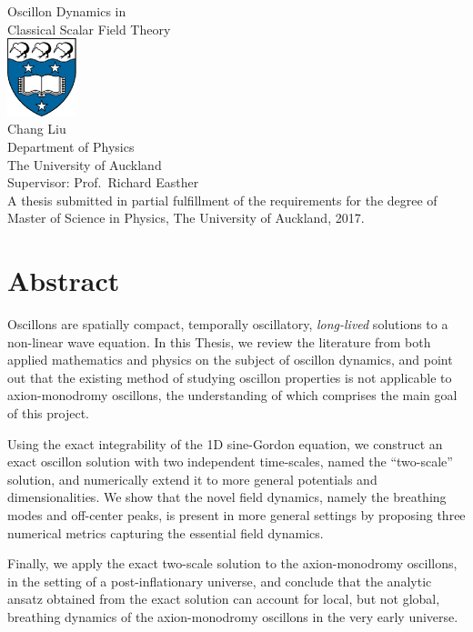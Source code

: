 \documentclass[11pt]{book}
\begin{document}
\pagestyle{empty}
\begin{center}
\vspace{1cm}
{\Huge Oscillon Dynamics in\\Classical Scalar Field Theory}\\
\vspace{35mm} 
\includegraphics[width=2cm]{logo.jpg}\\
\vspace{45mm}
{\Large Chang Liu}\\
\vspace{1ex}
Department of Physics\\
The University of Auckland\\
\vspace{5ex}
Supervisor: Prof.~Richard Easther\\
\vspace*{30mm}
A thesis submitted in partial fulfillment of the requirements for the degree of Master of Science in Physics, The University of Auckland, 2017.
\end{center}

\newpage

\chapter*{Abstract}       
Oscillons are spatially compact, temporally oscillatory, {\em long-lived} solutions to a non-linear wave equation. In this Thesis, we review the literature from both applied mathematics and physics on the subject of oscillon dynamics, and point out that the existing method of studying oscillon properties is not applicable to axion-monodromy oscillons, the understanding of which comprises the main goal of this project.

Using the exact integrability of the 1D sine-Gordon equation, we construct an exact oscillon solution with two independent time-scales, named the ``two-scale'' solution, and numerically extend it to more general potentials and dimensionalities. We show that the novel field dynamics, namely the breathing modes and off-center peaks, is present in more general settings by proposing three numerical metrics capturing the essential field dynamics.

Finally, we apply the exact two-scale solution to the axion-monodromy oscillons, in the setting of a post-inflationary universe, and conclude that the analytic ansatz obtained from the exact solution can account for local, but not global, breathing dynamics of the axion-monodromy oscillons in the very early universe.
\end{document}
